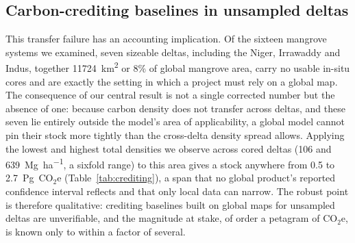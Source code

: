 \documentclass[11pt]{article}
\begin{document}
\subsection{Carbon-crediting baselines in unsampled deltas}
This transfer failure has an accounting implication. Of the sixteen mangrove systems we
examined, seven sizeable deltas, including the Niger, Irrawaddy and Indus, together
\SI{11724}{\kilo\metre\squared} or 8\% of global mangrove area, carry no usable in-situ
cores and are exactly the setting in which a project must rely on a global map. The
consequence of our central result is not a single corrected number but the absence of
one: because carbon density does not transfer across deltas, and these seven lie entirely
outside the model's area of applicability, a global model cannot pin their stock more
tightly than the cross-delta density spread allows. Applying the lowest and highest total
densities we observe across cored deltas (106 and \SI{639}{\mega\gram\per\hectare}, a
sixfold range) to this area gives a stock anywhere from 0.5 to
\SI{2.7}{\peta\gram}~CO$_2$e (Table~\ref{tab:crediting}), a span that no global product's
reported confidence interval reflects and that only local data can narrow. The robust
point is therefore qualitative: crediting baselines built on global maps for unsampled
deltas are unverifiable, and the magnitude at stake, of order a petagram of CO$_2$e, is
known only to within a factor of several.

\begin{table}[t]
\centering
\caption{Carbon at stake in the seven unsampled (prediction-only) deltas: mangrove area,
and the stock span obtained by applying the lowest and highest observed cross-delta
densities (106 and 639~Mg\,ha$^{-1}$). The span, not a point estimate, is the quantity a
global model cannot narrow because density does not transfer; all seven deltas lie outside
the area of applicability.}
\label{tab:crediting}

\end{table}
\end{document}
